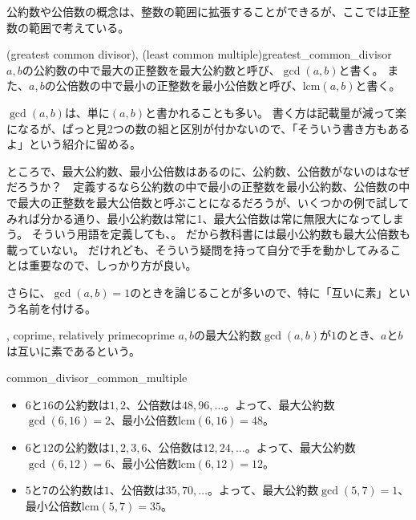 公約数や公倍数の概念は、整数の範囲に拡張することができるが、ここでは正整数の範囲で考えている。

\begin{Defi}{(greatest common divisor), (least common multiple)}{greatest_common_divisor}
$a,b$の公約数の中で最大の正整数を最大公約数と呼び、$\gcd(a,b)$と書く。
また、$a,b$の公倍数の中で最小の正整数を最小公倍数と呼び、$\mbox{lcm}(a,b)$と書く。
\end{Defi}

$\gcd(a,b)$は、単に$(a,b)$と書かれることも多い。
書く方は記載量が減って楽になるが、ぱっと見2つの数の組と区別が付かないので、「そういう書き方もあるよ」という紹介に留める。

ところで、最大公約数、最小公倍数はあるのに、公約数、公倍数がないのはなぜだろうか？　定義するなら公約数の中で最小の正整数を最小公約数、公倍数の中で最大の正整数を最大公倍数と呼ぶことになるだろうが、いくつかの例で試してみれば分かる通り、最小公約数は常に1、最大公倍数は常に無限大になってしまう。
そういう用語を定義しても、。
だから教科書には最小公約数も最大公倍数も載っていない。
だけれども、そういう疑問を持って自分で手を動かしてみることは重要なので、しっかり方が良い。

さらに、$\gcd(a,b)=1$のときを論じることが多いので、特に「互いに素」という名前を付ける。

\begin{Defi}{, coprime, relatively prime}{coprime}
$a,b$の最大公約数$\gcd(a,b)$が$1$のとき、$a$と$b$は互いに素であるという。
\end{Defi}

\begin{Exam}{}{common_divisor_common_multiple}\;
\begin{itemize}
 \item $6$と$16$の公約数は$1,2$、公倍数は$48, 96, \ldots$。よって、最大公約数$\gcd(6,16)=2$、最小公倍数$\mbox{lcm}(6,16)=48$。
 \item $6$と$12$の公約数は$1,2,3,6$、公倍数は$12, 24, \ldots$。よって、最大公約数$\gcd(6,12)=6$、最小公倍数$\mbox{lcm}(6,12)=12$。
 \item $5$と$7$の公約数は$1$、公倍数は$35, 70, \ldots$。よって、最大公約数$\gcd(5,7)=1$、最小公倍数$\mbox{lcm}(5,7)=35$。
\end{itemize}
\end{Exam}

